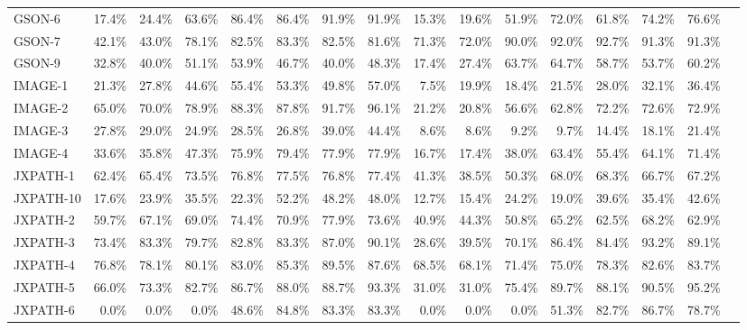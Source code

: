 \begin{tabular}{ l rrrrrrr rrrrrrrr}
GSON-6 &  17.4\% &  24.4\% &  63.6\% &  86.4\% &  86.4\% &  91.9\% &  91.9\% &  15.3\% &  19.6\% &  51.9\% &  72.0\% &  61.8\% &  74.2\% &  76.6\%\\ 
GSON-7 &  42.1\% &  43.0\% &  78.1\% &  82.5\% &  83.3\% &  82.5\% &  81.6\% &  71.3\% &  72.0\% &  90.0\% &  92.0\% &  92.7\% &  91.3\% &  91.3\%\\ 
GSON-9 &  32.8\% &  40.0\% &  51.1\% &  53.9\% &  46.7\% &  40.0\% &  48.3\% &  17.4\% &  27.4\% &  63.7\% &  64.7\% &  58.7\% &  53.7\% &  60.2\%\\ 
IMAGE-1 &  21.3\% &  27.8\% &  44.6\% &  55.4\% &  53.3\% &  49.8\% &  57.0\% &  7.5\% &  19.9\% &  18.4\% &  21.5\% &  28.0\% &  32.1\% &  36.4\%\\ 
IMAGE-2 &  65.0\% &  70.0\% &  78.9\% &  88.3\% &  87.8\% &  91.7\% &  96.1\% &  21.2\% &  20.8\% &  56.6\% &  62.8\% &  72.2\% &  72.6\% &  72.9\%\\ 
IMAGE-3 &  27.8\% &  29.0\% &  24.9\% &  28.5\% &  26.8\% &  39.0\% &  44.4\% &  8.6\% &  8.6\% &  9.2\% &  9.7\% &  14.4\% &  18.1\% &  21.4\%\\ 
IMAGE-4 &  33.6\% &  35.8\% &  47.3\% &  75.9\% &  79.4\% &  77.9\% &  77.9\% &  16.7\% &  17.4\% &  38.0\% &  63.4\% &  55.4\% &  64.1\% &  71.4\%\\ 
JXPATH-1 &  62.4\% &  65.4\% &  73.5\% &  76.8\% &  77.5\% &  76.8\% &  77.4\% &  41.3\% &  38.5\% &  50.3\% &  68.0\% &  68.3\% &  66.7\% &  67.2\%\\ 
JXPATH-10 &  17.6\% &  23.9\% &  35.5\% &  22.3\% &  52.2\% &  48.2\% &  48.0\% &  12.7\% &  15.4\% &  24.2\% &  19.0\% &  39.6\% &  35.4\% &  42.6\%\\ 
JXPATH-2 &  59.7\% &  67.1\% &  69.0\% &  74.4\% &  70.9\% &  77.9\% &  73.6\% &  40.9\% &  44.3\% &  50.8\% &  65.2\% &  62.5\% &  68.2\% &  62.9\%\\ 
JXPATH-3 &  73.4\% &  83.3\% &  79.7\% &  82.8\% &  83.3\% &  87.0\% &  90.1\% &  28.6\% &  39.5\% &  70.1\% &  86.4\% &  84.4\% &  93.2\% &  89.1\%\\ 
JXPATH-4 &  76.8\% &  78.1\% &  80.1\% &  83.0\% &  85.3\% &  89.5\% &  87.6\% &  68.5\% &  68.1\% &  71.4\% &  75.0\% &  78.3\% &  82.6\% &  83.7\%\\ 
JXPATH-5 &  66.0\% &  73.3\% &  82.7\% &  86.7\% &  88.0\% &  88.7\% &  93.3\% &  31.0\% &  31.0\% &  75.4\% &  89.7\% &  88.1\% &  90.5\% &  95.2\%\\ 
JXPATH-6 &  0.0\% &  0.0\% &  0.0\% &  48.6\% &  84.8\% &  83.3\% &  83.3\% &  0.0\% &  0.0\% &  0.0\% &  51.3\% &  82.7\% &  86.7\% &  78.7\%\\ 

\end{tabular}
